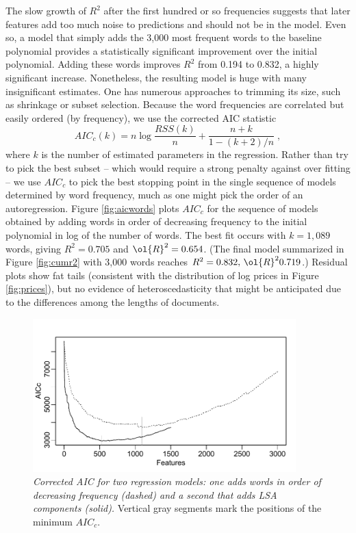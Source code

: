 \documentclass[12pt]{article}
\begin{document}
The slow growth of $R^2$ after the first hundred or so frequencies suggests that later features add too much noise to predictions and should not be in the model.  Even so, a model that simply adds the 3,000 most frequent words to the baseline polynomial provides a statistically significant improvement over the initial polynomial. Adding these words improves $R^2$ from 0.194 to 0.832, a highly significant increase.  Nonetheless, the resulting model is huge with many insignificant estimates.  One has numerous approaches to trimming its size, such as shrinkage or subset selection.  Because the word frequencies are correlated but easily ordered (by frequency), we use the corrected AIC statistic \citep{hurvich89}
\begin{equation}
    AIC_{c}(k) = n \log \frac{RSS(k)}{n} + \frac{n+k}{1-(k+2)/n} \;,
\end{equation}
where $k$ is the number of estimated parameters in the regression.  Rather than try to pick the best subset -- which would require a strong penalty against over fitting -- we use $AIC_c$ to pick the best stopping point in the single sequence of models determined by word frequency, much as one might pick the order of an autoregression.  Figure \ref{fig:aicwords} plots $AIC_c$ for the sequence of models obtained by adding words in order of decreasing frequency to the initial polynomial in log of the number of words.   The best fit  occurs with $k=1,089$ words, giving $R^2 =  0.705$ and $\ol{R}^2=0.654$. (The final model summarized in Figure \ref{fig:cumr2} with 3,000 words reaches $R^2 =  0.832, \, \ol{R}^2  0.719$.)  Residual plots show fat tails (consistent with the distribution of log prices in Figure \ref{fig:prices}), but no evidence of heteroscedasticity
 that might be anticipated due to the differences among the lengths of documents.

\begin{figure}
\caption{  \label{fig:aic}  
  {\sl Corrected AIC for two regression models: one adds words in order of decreasing frequency (dashed) and a second that adds LSA components (solid).}  Vertical gray segments mark the positions of the minimum $AIC_c$.}
  \centerline{ \includegraphics[width=4in]{figures/aic.pdf} }
\end{figure}
\end{document}
